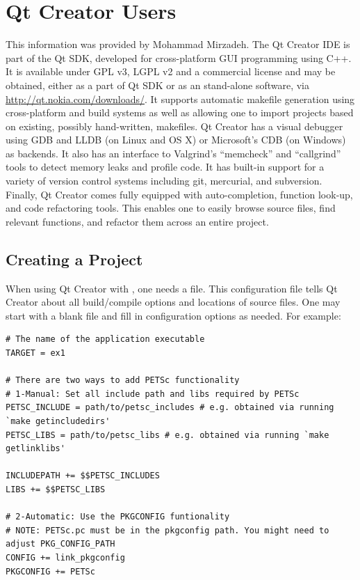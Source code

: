 {{{\section{Qt Creator Users} 
This information was provided by Mohammad Mirzadeh.
The Qt Creator IDE is part of the Qt SDK, developed for cross-platform GUI programming using C++. 
It is available under GPL v3, LGPL v2 and a commercial license and may be obtained, either as a 
part of Qt SDK or as an stand-alone software, via \url{http://qt.nokia.com/downloads/}.
It supports automatic makefile generation using cross-platform  and 
build systems as well as allowing one to import projects based on existing, possibly hand-written, makefiles.
Qt Creator has a visual debugger using GDB and LLDB (on Linux and OS X) or Microsoft's
CDB (on Windows) as backends. It also has an interface to Valgrind's ``memcheck'' and ``callgrind''
tools to detect memory leaks and profile code. It has built-in support for a variety of version
control systems including git, mercurial, and subversion. Finally, Qt Creator comes fully equipped with
auto-completion, function look-up, and code refactoring tools. This enables one to easily browse source
files, find relevant functions, and refactor them across an entire project.

\subsection*{Creating a Project}
When using Qt Creator with , one needs a  file. This configuration file
tells Qt Creator about all build/compile options and locations of source files. One may start with
a blank  file and fill in configuration options as needed. For example:
\begin{lstlisting}
# The name of the application executable
TARGET = ex1

# There are two ways to add PETSc functionality
# 1-Manual: Set all include path and libs required by PETSc
PETSC_INCLUDE = path/to/petsc_includes # e.g. obtained via running `make getincludedirs'
PETSC_LIBS = path/to/petsc_libs # e.g. obtained via running `make getlinklibs'

INCLUDEPATH += $$PETSC_INCLUDES
LIBS += $$PETSC_LIBS

# 2-Automatic: Use the PKGCONFIG funtionality
# NOTE: PETSc.pc must be in the pkgconfig path. You might need to adjust PKG_CONFIG_PATH
CONFIG += link_pkgconfig
PKGCONFIG += PETSc


\end{lstlisting}}}}
